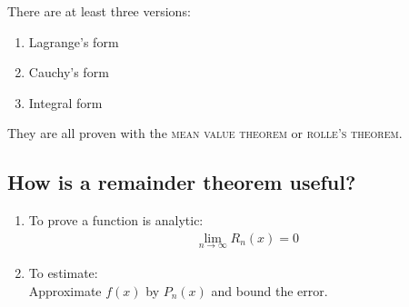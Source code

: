 There are at least three versions: \begin{enumerate}
    \item Lagrange's form
    \item Cauchy's form
    \item Integral form
\end{enumerate}
They are all proven with the \textsc{mean value theorem} or \textsc{rolle's theorem}.

\subsection*{How is a remainder theorem useful?}
\begin{enumerate}
    \item To prove a function is analytic: \begin{align*}
              \lim_{n\to\infty} R_n(x) = 0
          \end{align*}
    \item To estimate: \\
          Approximate \(f(x)\) by \(P_n(x)\) and bound the error.
\end{enumerate}



\newpage
